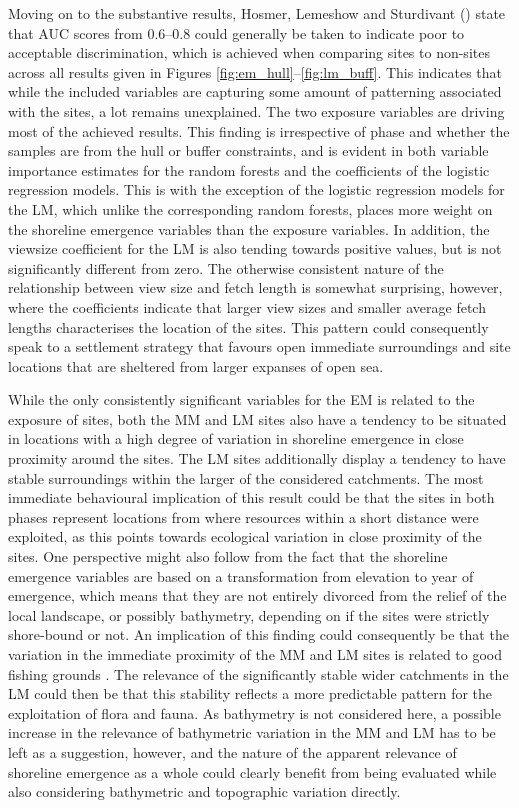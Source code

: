 \documentclass[12pt, a4paper]{article}
\begin{document}
Moving on to the substantive results, Hosmer, Lemeshow and Sturdivant (\citeyear[][177]{hosmer2013}) state that AUC scores from 0.6--0.8 could generally be taken to indicate poor to acceptable discrimination, which is achieved when comparing sites to non-sites across all results given in Figures \ref{fig:em_hull}--\ref{fig:lm_buff}. This indicates that while the included variables are capturing some amount of patterning associated with the sites, a lot remains unexplained. The two exposure variables are driving most of the achieved results. This finding is irrespective of phase and whether the samples are from the hull or buffer constraints, and is evident in both variable importance estimates for the random forests and the coefficients of the logistic regression models. This is with the exception of the logistic regression models for the LM, which unlike the corresponding random forests, places more weight on the shoreline emergence variables than the exposure variables. In addition, the viewsize coefficient for the LM is also tending towards positive values, but is not significantly different from zero. The otherwise consistent nature of the relationship between view size and fetch length is somewhat surprising, however, where the coefficients indicate that larger view sizes and smaller average fetch lengths characterises the location of the sites. This pattern could consequently speak to a settlement strategy that favours open immediate surroundings and site locations that are sheltered from larger expanses of open sea. \par 
While the only consistently significant variables for the EM is related to the exposure of sites, both the MM and LM sites also have a tendency to be situated in locations with a high degree of variation in shoreline emergence in close proximity around the sites. The LM sites additionally display a tendency to have stable surroundings within the larger of the considered catchments. The most immediate behavioural implication of this result could be that the sites in both phases represent locations from where resources within a short distance were exploited, as this points towards ecological variation in close proximity of the sites. One perspective might also follow from the fact that the shoreline emergence variables are based on a transformation from elevation to year of emergence, which means that they are not entirely divorced from the relief of the local landscape, or possibly bathymetry, depending on if the sites were strictly shore-bound or not. An implication of this finding could consequently be that the variation in the immediate proximity of the MM and LM sites is related to good fishing grounds \citep[cf.][]{darmark2018}. The relevance of the significantly stable wider catchments in the LM could then be that this stability reflects a more predictable pattern for the exploitation of ﬂora and fauna. As bathymetry is not considered here, a possible increase in the relevance of bathymetric variation in the MM and LM has to be left as a suggestion, however, and the nature of the apparent relevance of shoreline emergence as a whole could clearly benefit from being evaluated while also considering bathymetric and topographic variation directly. \par
\end{document}
